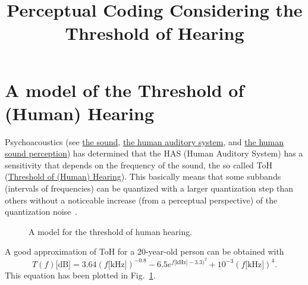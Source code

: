 
\title{Perceptual Coding Considering the Threshold of Hearing}

\maketitle
\tableofcontents

\section{A model of the Threshold of (Human) Hearing}

Psychoacoustics (see
\href{https://vicente-gonzalez-ruiz.github.io/the_sound/}{the sound},
\href{https://vicente-gonzalez-ruiz.github.io/human_auditory_system/}{the
  human auditory system}, and
\href{https://vicente-gonzalez-ruiz.github.io/human_sound_perception/}{the
  human sound perception}) has determined that the HAS (Human Auditory
System) has a sensitivity that depends on the frequency of the sound,
the so called ToH
(\href{https://en.wikipedia.org/wiki/Absolute_threshold_of_hearing}{Threshold
  of (Human) Hearing}). This basically means that some subbands
(intervals of frequencies) can be quantized with a larger quantization
step than others without a noticeable increase (from a perceptual
perspective) of the quantization noise~\cite{sayood2017introduction}.

\begin{figure}
  \centering
  \caption{A model for the threshold of human hearing.}
  \label{fig:ToHH}
\end{figure}

A good approximation of ToH for a 20-year-old person can be
obtained with~\cite{bosi2003intro}
\begin{equation}
  T(f)\text{[dB]} = 3.64(f\text{[kHz]})^{-0.8} - 6.5e^{f\text{[kHz]}-3.3)^2} + 10^{-3}(f\text{[kHz]})^4.
  \label{eq:ToHH}
\end{equation}
This equation has been plotted in Fig.~\ref{fig:ToHH}.

